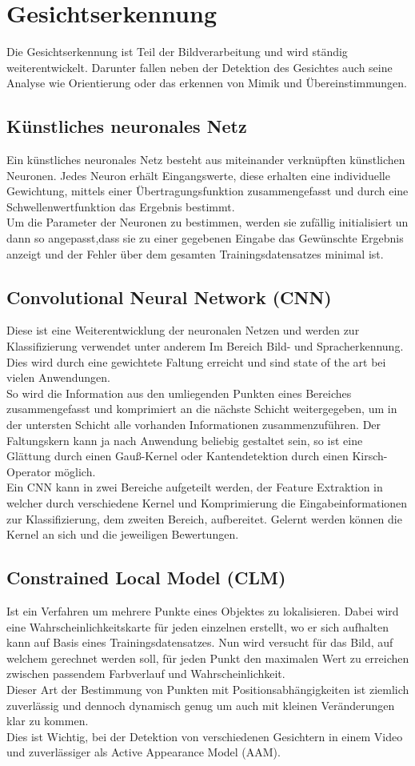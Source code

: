 \section{Gesichtserkennung}
Die Gesichtserkennung ist Teil der Bildverarbeitung und wird ständig weiterentwickelt. Darunter fallen neben der Detektion des Gesichtes auch seine Analyse wie Orientierung oder das erkennen von Mimik und Übereinstimmungen. 
\subsection{Künstliches neuronales Netz}
Ein künstliches neuronales Netz besteht aus miteinander verknüpften künstlichen Neuronen. Jedes Neuron erhält Eingangswerte, diese erhalten eine individuelle Gewichtung, mittels einer Übertragungsfunktion zusammengefasst und durch eine Schwellenwertfunktion das Ergebnis bestimmt.\\
Um die Parameter der Neuronen zu bestimmen, werden sie zufällig initialisiert un dann so angepasst,dass sie zu einer gegebenen Eingabe das Gewünschte Ergebnis anzeigt und der Fehler über dem gesamten Trainingsdatensatzes minimal ist.
\subsection{Convolutional Neural Network (CNN)}
Diese ist eine Weiterentwicklung der neuronalen Netzen und werden zur Klassifizierung verwendet unter anderem Im Bereich Bild- und Spracherkennung. Dies wird durch eine gewichtete Faltung erreicht und sind  state of the art bei vielen Anwendungen.\\
So wird die Information aus den umliegenden Punkten eines Bereiches zusammengefasst und komprimiert an die nächste Schicht weitergegeben, um in der untersten Schicht alle vorhanden Informationen zusammenzuführen. 
Der Faltungskern kann ja nach Anwendung beliebig gestaltet sein, so ist eine Glättung durch einen Gauß-Kernel oder Kantendetektion durch einen Kirsch-Operator möglich.\\
Ein CNN kann in zwei Bereiche aufgeteilt werden, der Feature Extraktion in welcher durch verschiedene Kernel und Komprimierung die Eingabeinformationen zur Klassifizierung, dem zweiten Bereich, aufbereitet.
Gelernt werden können die Kernel an sich und die jeweiligen Bewertungen.
\subsection{Constrained Local Model (CLM)}
Ist ein Verfahren um mehrere Punkte eines Objektes zu lokalisieren. Dabei wird eine Wahrscheinlichkeitskarte für jeden einzelnen erstellt, wo er sich aufhalten kann auf Basis eines Trainingsdatensatzes. Nun wird versucht für das Bild, auf welchem gerechnet werden soll, für jeden Punkt den maximalen Wert zu erreichen zwischen passendem Farbverlauf und Wahrscheinlichkeit.\\
Dieser Art der Bestimmung von Punkten mit Positionsabhängigkeiten ist ziemlich zuverlässig und dennoch dynamisch genug um auch mit kleinen Veränderungen klar zu kommen.\\
Dies ist Wichtig, bei der Detektion von verschiedenen Gesichtern in einem Video und zuverlässiger als Active Appearance Model (AAM). 
